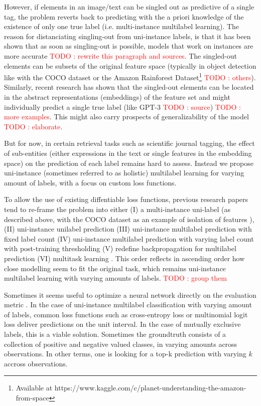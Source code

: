 \documentclass[sigconf,natbib,screen=true,review=true,anonymous]{acmart}
\newcommand\todo[1]{\textcolor{red}{TODO : #1}}
\begin{document}
However, if elements in an image/text can be singled out as predictive of a single tag, the problem reverts back to predicting with the a priori knowledge of the existence of only one true label (i.e. multi-instance multilabel learning).  The reason for distanciating singling-out from uni-instance labels, is that it has been shown that as soon as singling-out is possible, models that work on instances are more accurate \todo{rewrite this paragraph and sources}. The singled-out elements can be subsets of the original feature space (typically in object detection like with the COCO dataset  \cite{COCO} or the Amazon Rainforest Dataset\footnote{Available at https://www.kaggle.com/c/planet-understanding-the-amazon-from-space} \todo{others}). Similarly, recent research has shown that the singled-out elements can be located in the abstract representations (embeddings) of the feature set and might individually predict a single true label (like GPT-3 \todo{source}) \todo{more examples}. This might also carry prospects of generalizability of the model \cite{generalization} \todo{elaborate}. 

But for now, in certain retrieval tasks such as scientific journal tagging, the effect of sub-entities (either expressions in the text or single features in the embedding space) on the prediction of each label remains hard to assess. Instead we propose uni-instance (sometimes referred to as holistic) multilabel learning for varying amount of labels, with a focus on custom loss functions.

To allow the use of existing diffentiable loss functions, previous research papers tend to re-frame the problem into either (I) a multi-instance uni-label (as described above, with the COCO dataset as an example of isolation of features \cite{COCO}), (II) uni-instance unilabel prediction (III) uni-instance multilabel prediction with fixed label count (IV) uni-instance multilabel prediction with varying label count with post-training thresholding (V) redefine backpropagation for multilabel prediction \cite{multilabelBackprop} (VI) multitask learning \cite{multitaskLabel}. This order reflects in ascending order how close modelling seem to fit the original task, which remains uni-instance multilabel learning with varying amounts of labels. \todo{group them}

Sometimes it seems useful to optimize a neural network directly on the evaluation metric \cite{optimizableLosses}. In the case of uni-instance multilabel classification with varying amount of labels, common loss functions such as cross-entropy loss or multinomial logit loss deliver predictions on the unit interval. In the case of mutually exclusive labels, this is a viable solution. Sometimes the groundtruth consists of a collection of positive and negative valued classes, in varying amounts across observations. In other terms, one is  looking for a top-k prediction with varying \(k\) accross observations.
\end{document}
